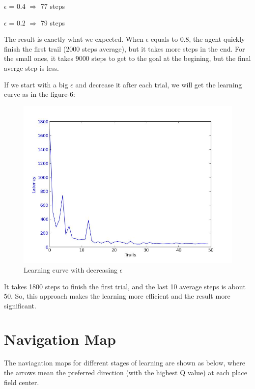 \documentclass[a4paper, 11pt]{article}
\begin{document}
$\epsilon$ = 0.4 $\Rightarrow$ 77  steps

$\epsilon$ = 0.2 $\Rightarrow$ 79 steps

The result is exactly what we expected. When $\epsilon$ equals to 0.8, the agent quickly finish the first trail (2000 steps average), but it takes more steps in the end. For the small ones, it takes 9000 steps to get to the goal at the begining, but the final averge step is less.

If we start with a big $\epsilon$ and decrease it after each trial, we will get the learning curve as in the figure-6:

\begin{figure}[h]
\centering
\includegraphics[scale=0.35]{../figure/decEps.jpeg}
\caption{Learning curve with decreasing $\epsilon$}
\end{figure}


It takes 1800 steps to finish the first trial, and the last 10 average steps is about 50. So, this approach makes the learning more efficient and the result more significant.

\section{Navigation Map}

The naviagation maps for different stages of learning are shown as below, where the arrows mean the preferred direction (with the highest Q value) at each place field center.
\end{document}
